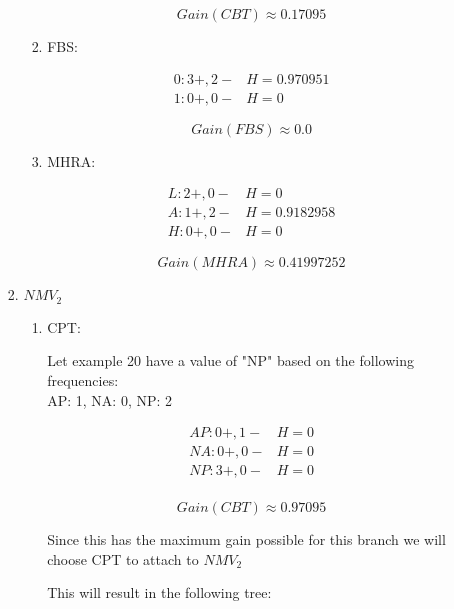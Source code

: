 \begin{enumerate}
\begin{enumerate}
\begin{enumerate}
\begin{enumerate}
								\[
									Gain(CBT) \approx 0.17095
								\]
						
							\item{FBS:}
								
								\[
									\begin{array}{l|l}
										0: 3+, 2- & H = 0.970951 \\
										1: 0+, 0- & H = 0
									\end{array}
								\]
								
								\[
									Gain(FBS) \approx 0.0
								\]
							
							\item{MHRA:}
								
								\[
									\begin{array}{l|l}
										L: 2+, 0- & H = 0 \\
										A: 1+, 2- & H = 0.9182958 \\
										H: 0+, 0- & H = 0
									\end{array}
								\]
								
								\[
									Gain(MHRA) \approx 0.41997252
								\]
						
						\end{enumerate}
				
					\item{\( NMV_2 \) }
				
						\begin{enumerate}
							
							\item{CPT:}

								Let example 20 have a value of "NP" based on the following frequencies: \\
								AP: 1, NA: 0, NP: 2
							
								\[
									\begin{array}{l|l}
										AP: 0+, 1- & H = 0 \\
										NA: 0+, 0- & H = 0 \\
										NP: 3+, 0- & H = 0 \\
									\end{array}
								\]
								
								\[
									Gain(CBT) \approx 0.97095
								\]
								
								Since this has the maximum gain possible for this branch we will choose CPT to attach to \( NMV_2 \)
								
								This will result in the following tree:
								

\end{enumerate}
\end{enumerate}
\end{enumerate}
\end{enumerate}
